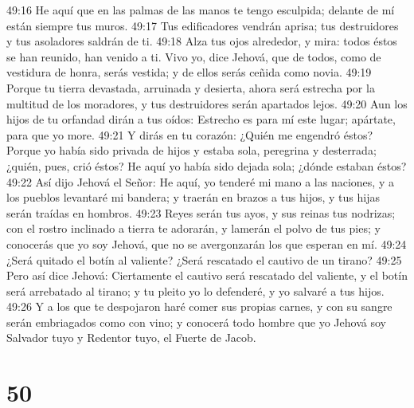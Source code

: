49:16 He aquí que en las palmas de las manos te tengo esculpida; delante de mí están siempre tus muros.  
49:17 Tus edificadores vendrán aprisa; tus destruidores y tus asoladores saldrán de ti.  
49:18 Alza tus ojos alrededor, y mira: todos éstos se han reunido, han venido a ti. Vivo yo, dice Jehová, que de todos, como de vestidura de honra, serás vestida; y de ellos serás ceñida como novia.  
49:19 Porque tu tierra devastada, arruinada y desierta, ahora será estrecha por la multitud de los moradores, y tus destruidores serán apartados lejos.  
49:20 Aun los hijos de tu orfandad dirán a tus oídos: Estrecho es para mí este lugar; apártate, para que yo more.  
49:21 Y dirás en tu corazón: ¿Quién me engendró éstos? Porque yo había sido privada de hijos y estaba sola, peregrina y desterrada; ¿quién, pues, crió éstos? He aquí yo había sido dejada sola; ¿dónde estaban éstos?  
49:22 Así dijo Jehová el Señor: He aquí, yo tenderé mi mano a las naciones, y a los pueblos levantaré mi bandera; y traerán en brazos a tus hijos, y tus hijas serán traídas en hombros.  
49:23 Reyes serán tus ayos, y sus reinas tus nodrizas; con el rostro inclinado a tierra te adorarán, y lamerán el polvo de tus pies; y conocerás que yo soy Jehová, que no se avergonzarán los que esperan en mí.  
49:24 ¿Será quitado el botín al valiente? ¿Será rescatado el cautivo de un tirano?  
49:25 Pero así dice Jehová: Ciertamente el cautivo será rescatado del valiente, y el botín será arrebatado al tirano; y tu pleito yo lo defenderé, y yo salvaré a tus hijos.  
49:26 Y a los que te despojaron haré comer sus propias carnes, y con su sangre serán embriagados como con vino; y conocerá todo hombre que yo Jehová soy Salvador tuyo y Redentor tuyo, el Fuerte de Jacob.  

\chapter{50}

